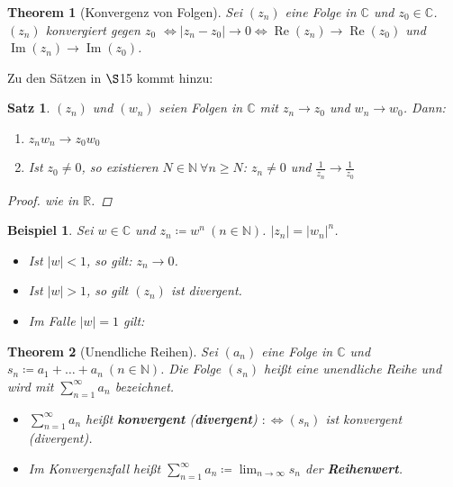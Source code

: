\documentclass[12pt]{extreport} %
\newcommand{\C}{\mathbb{C}}
\newcommand{\N}{\mathbb{N}}
\newcommand{\R}{\mathbb{R}}
\theoremstyle{named}
\theoremstyle{nnamed}
\newtheorem*{unnamedtheorem*}{Theorem}
\theoremstyle{itshape}
\newtheorem{satz}[unnamedtheorem]{Satz}
\theoremstyle{normal}
\newtheorem*{beispiel*}{Beispiel}
\begin{document}
\begin{unnamedtheorem*}[Konvergenz von Folgen]
	Sei $(z_{n})$ eine Folge in $\C$ und $z_{0} \in \C$. $(z_{n})$ konvergiert gegen $z_{0}$ $\iff |z_{n} - z_{0}| \rightarrow 0 \overset{}{\iff} \operatorname{Re}(z_{n}) \rightarrow \operatorname{Re}(z_{0})$ und $\operatorname{Im}(z_{n}) \rightarrow \operatorname{Im}(z_{0})$.
\end{unnamedtheorem*}

Zu den Sätzen in $\S$15 kommt hinzu:

\begin{satz} \label{17.1:satz}
	$(z_{n})$ und $(w_{n})$ seien Folgen in $\C$ mit $z_{n} \rightarrow z_{0}$ und $w_{n} \rightarrow w_{0}$. Dann:
	\begin{enumerate}
		\item $z_{n} w_{n} \rightarrow z_{0} w_{0}$
		\item Ist $z_{0} \neq 0$, so existieren $N \in \N ~\forall n \geq N$: $z_{n} \neq 0$ und $\frac{1}{z_{n}} \longrightarrow \frac{1}{z_{0}}$ 
	\end{enumerate}
	
	\begin{proof}
		wie in $\R$.
	\end{proof}
\end{satz}


\begin{beispiel*}
	Sei $w \in \C$ und $z_{n} \coloneqq w^{n} ~(n \in \N)$. $|z_{n}| = |w_{n}|^{n}$.
	\begin{itemize}
		\item Ist $|w| < 1$, so gilt: $z_{n} \longrightarrow 0$.
		\item Ist $|w| > 1$, so gilt $(z_{n})$ ist divergent.
		\item Im Falle $|w| = 1$ gilt:
	\end{itemize}
\end{beispiel*}

  
\begin{unnamedtheorem*}[Unendliche Reihen]
	Sei $(a_{n})$ eine Folge in $\C$ und $s_{n} \coloneqq a_{1} + \dotsc + a_{n} ~(n \in \N)$. Die Folge $(s_{n})$ hei{\ss}t eine unendliche Reihe und wird mit $\sum_{n=1}^{\infty} a_{n}$ bezeichnet.
	\begin{itemize}
		\item $\sum_{n=1}^{\infty} a_{n}$ hei{\ss}t \textbf{konvergent} (\textbf{divergent}) $: \iff (s_{n})$ ist konvergent (divergent).
		\item Im Konvergenzfall hei{\ss}t $\sum_{n=1}^{\infty} a_{n} \coloneqq \lim_{n \rightarrow \infty} s_{n}$ der \textbf{Reihenwert}.
	\end{itemize}
\end{unnamedtheorem*}
\end{document}
